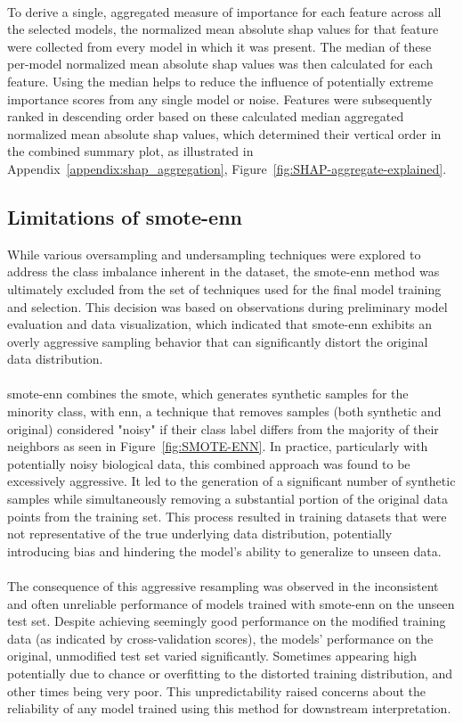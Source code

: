 \documentclass[12pt,a4paper]{report}
\begin{document}
\\
To derive a single, aggregated measure of importance for each feature across all the selected models, the normalized mean absolute \gls{shap} values for that feature were collected from every model in which it was present. The median of these per-model normalized mean absolute \gls{shap} values was then calculated for each feature. Using the median helps to reduce the influence of potentially extreme importance scores from any single model or noise. Features were subsequently ranked in descending order based on these calculated median aggregated normalized mean absolute \gls{shap} values, which determined their vertical order in the combined summary plot, as illustrated in Appendix~\ref{appendix:shap_aggregation}, Figure~\ref{fig:SHAP-aggregate-explained}.

\subsection{Limitations of \gls{smote}-\gls{enn}}
\noindent
While various oversampling and undersampling techniques were explored to address the class imbalance inherent in the dataset, the \gls{smote}-\gls{enn} method was ultimately excluded from the set of techniques used for the final model training and selection. This decision was based on observations during preliminary model evaluation and data visualization, which indicated that \gls{smote}-\gls{enn} exhibits an overly aggressive sampling behavior that can significantly distort the original data distribution.\\
\\
\gls{smote}-\gls{enn} combines the \acrfull{smote}, which generates synthetic samples for the minority class, with \acrfull{enn}, a technique that removes samples (both synthetic and original) considered "noisy" if their class label differs from the majority of their neighbors as seen in Figure~\ref{fig:SMOTE-ENN}. In practice, particularly with potentially noisy biological data, this combined approach was found to be excessively aggressive. It led to the generation of a significant number of synthetic samples while simultaneously removing a substantial portion of the original data points from the training set. This process resulted in training datasets that were not representative of the true underlying data distribution, potentially introducing bias and hindering the model's ability to generalize to unseen data.\\
\\
The consequence of this aggressive resampling was observed in the inconsistent and often unreliable performance of models trained with \gls{smote}-\gls{enn} on the unseen test set. Despite achieving seemingly good performance on the modified training data (as indicated by cross-validation scores), the models' performance on the original, unmodified test set varied significantly. Sometimes appearing high potentially due to chance or overfitting to the distorted training distribution, and other times being very poor. This unpredictability raised concerns about the reliability of any model trained using this method for downstream interpretation.\\
\end{document}
